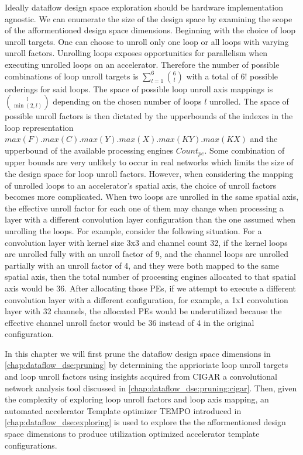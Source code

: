Ideally dataflow design space exploration should be hardware implementation
agnostic. We can enumerate the size of the design space by examining the scope
of the afformentioned design space dimensions. Beginning with the choice of loop
unroll targets. One can choose to unroll only one loop or all loops with
varying unroll factors. Unrolling loops exposes opportunities for parallelism
when executing unrolled loops on an accelerator. Therefore the number of
possible combinations of loop unroll targets is
$\sum\limits_{l=1}^{6}\binom{6}{l}$ with a total of $6!$ possible orderings for
said loops. The space of possible loop unroll axis mappings is $\binom{l}{\min(2,
l)}$ depending on the chosen number of loops $l$ unrolled. The space of possible
unroll factors is then dictated by the upperbounds of the indexes in the loop
representation $max(F).max(C).max(Y).max(X).max(KY).max(KX)$ and the upperbound
of the available processing engines $Count_{pe}$. Some combination of upper
bounds are very unlikely to occur in real networks which limits the size of the
design space for loop unroll factors. However, when considering the
mapping of unrolled loops to an accelerator's spatial axis, the choice of unroll
factors becomes more complicated. When two loops are unrolled in the same
spatial axis, the effective unroll factor for each one of them may change when
processing a layer with a different convolution layer configuration than the one
assumed when unrolling the loops. For example, consider the following situation.
For a convolution layer with kernel size 3x3 and channel count 32, if the kernel
loops are unrolled fully with an unroll factor of 9, and the channel loops are
unrolled partially with an unroll factor of 4, and they were both mapped to the
same spatial axis, then the total number of processing engines allocated to that
spatial axis would be 36. After allocating those PEs, if we attempt to execute a
different convolution layer with a different configuration, for example, a 1x1
convolution layer with 32 channels, the allocated PEs would be underutilized because
the effective channel unroll factor would be 36 instead of 4 in the original
configuration.

In this chapter we will first prune the dataflow design space dimensions in
\autoref{chap:dataflow_dse:pruning} by determining the apprioriate
loop unroll targets and loop unroll factors using insights acquired from
\ac{CIGAR} a convolutional network analysis tool discussed in
\autoref{chap:dataflow_dse:pruning:cigar}. Then, given the complexity of
exploring loop unroll factors and loop axis mapping, an automated accelerator
Template optimizer TEMPO introduced in \autoref{chap:dataflow_dse:exploring} is
used to explore the the afformentioned design space dimensions to produce
utilization optimized accelerator template configurations. 

